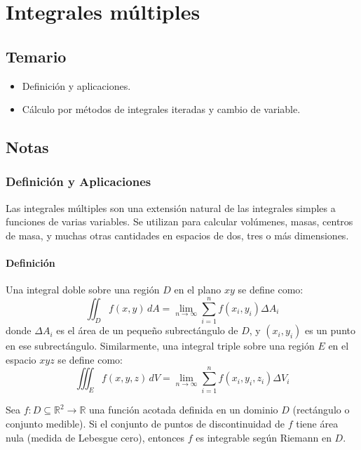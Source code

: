 \documentclass[11pt]{book}
\theoremstyle{definicion}
\theoremstyle{teorema}
\theoremstyle{ejemplo}
\newtheorem{proposition}{Proposition}
\begin{document}
\chapter{Integrales múltiples}

\section{Temario}

\begin{itemize}
    \item Definición y aplicaciones. 
    \item Cálculo por métodos de integrales iteradas y cambio de variable.
\end{itemize}

\section{Notas}

\subsection{Definición y Aplicaciones}

Las integrales múltiples son una extensión natural de las integrales simples a funciones de varias variables. Se utilizan para calcular volúmenes, masas, centros de masa, y muchas otras cantidades en espacios de dos, tres o más dimensiones.

\subsubsection{Definición}

\noindent Una integral doble sobre una región \( D \) en el plano \( xy \) se define como:
\[
\iint_D f(x, y) \, dA = \lim_{n \to \infty} \sum_{i=1}^{n} f(x_i, y_i) \Delta A_i
\]
donde \( \Delta A_i \) es el área de un pequeño subrectángulo de \( D \), y \( (x_i, y_i) \) es un punto en ese subrectángulo. Similarmente, una integral triple sobre una región \( E \) en el espacio \( xyz \) se define como:
\[
\iiint_E f(x, y, z) \, dV = \lim_{n \to \infty} \sum_{i=1}^{n} f(x_i, y_i, z_i) \Delta V_i
\]

Sea \( f: D \subseteq \mathbb{R}^2 \to \mathbb{R} \) una función acotada definida en un dominio \( D \) (rectángulo o conjunto medible).
Si el conjunto de puntos de discontinuidad de \( f \) tiene área nula (medida de Lebesgue cero),
entonces \( f \) es integrable según Riemann en \( D \).
\end{document}
